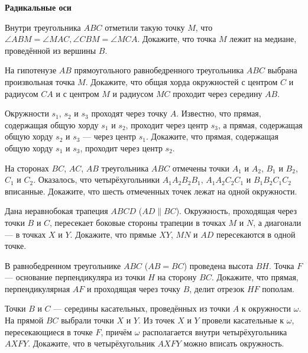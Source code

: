 \documentclass{article}
\begin{document}
    \large

    \begin{center}
        \textbf{Радикальные оси}
    \end{center}

    \begin{enumerate_boxed}

        \item Внутри треугольника $ABC$ отметили такую точку $M$, что $\angle ABM=\angle MAC, \angle CBM=\angle MCA$.
        Докажите, что точка $M$ лежит на медиане, проведённой из вершины $B$.

        \setcounter{enumi}{1}
        \item На гипотенузе $AB$ прямоугольного равнобедренного треугольника $ABC$ выбрана произвольная точка $M$.
        Докажите, что общая хорда окружностей с центром $C$ и радиусом $CA$ и с центром $M$ и радиусом $MC$ проходит через середину $AB$.

        \item Окружности $s_1$, $s_2$ и $s_3$ проходят через точку $A$.
        Известно, что прямая, содержащая общую хорду $s_1$ и $s_2$, проходит через центр $s_3$, а прямая, содержащая общую хорду $s_2$ и $s_3$ — через центр $s_1$.
        Докажите, что прямая, содержащая общую хорду $s_1$ и $s_3$, проходит через центр $s_2$.

        \item На сторонах $BC$, $AC$, $AB$ треугольника $ABC$ отмечены точки $A_1$ и $A_2$, $B_1$ и $B_2$, $C_1$ и $C_2$.
        Оказалось, что четырёхугольники $A_{1}A_{2}B_{2}B_1$, $A_{1}A_{2}C_{2}C_1$ и $B_{1}B_{2}C_{1}C_2$ вписанные.
        Докажите, что шесть отмеченных точек лежат на одной окружности.

        \item Дана неравнобокая трапеция $ABCD$ ($AD\parallel BC$). Окружность, проходящая через точки $B$ и $C$, пересекает боковые стороны трапеции в точках $M$ и $N$, а диагонали — в точках $X$ и $Y$.
        Докажите, что прямые $XY$, $MN$ и $AD$ пересекаются в одной точке.

        \item В равнобедренном треугольнике $ABC$ ($AB=BC$) проведена высота $BH$.
        Точка $F$ — основание перпендикуляра из точки $H$ на сторону $BC$.
        Докажите, что прямая, перпендикулярная $AF$ и проходящая через точку $B$, делит отрезок $HF$ пополам.

        \item Точки $B$ и $C$ — середины касательных, проведённых из точки $A$ к окружности $\omega$.
        На прямой $BC$ выбрали точки $X$ и $Y$.
        Из точек $X$ и $Y$ провели касательные к $\omega$, пересекающиеся в точке $F$, причём $\omega$ располагается внутри четырёхугольника $AXFY$.
        Докажите, что в четырёхугольник $AXFY$ можно вписать окружность.


\end{enumerate_boxed}
\end{document}
